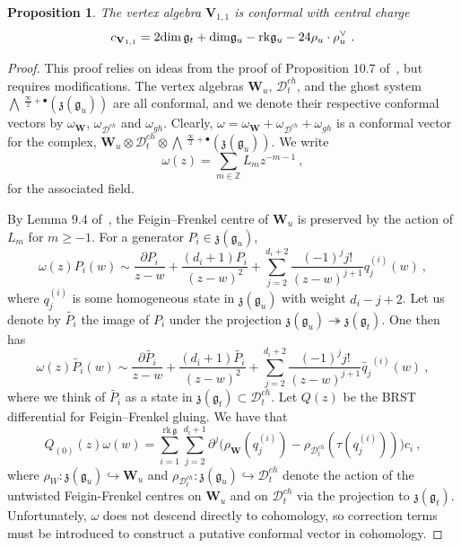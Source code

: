 \documentclass[a4paper]{article}
\newtheorem{prop}[thm]{Proposition}
\def\IZ{\mathbb{Z}}
\def\dim{{\rm dim}}
\def\gf{\mathfrak{g}}
\def \zf{\mathfrak{z}}
\def \rk{\mathrm{rk}}
\newcommand{\Li}[1]{\mathrm{\bigwedge}\,^{\frac{\infty}{2}+#1}}
\def\D{\mathcal{D}^{ch}}
\def\W{\mathbf{W}}
\def\V{\mathbf{V}}
\begin{document}
\begin{prop}\label{prop:mixed_trin_conf}
The vertex algebra $\V_{1,1}$ is conformal with central charge
\begin{equation*}
	c_{\V_{1,1}} = 2\dim\,\gf_t + \dim \gf_u -\rk \gf_u -24 \rho_u\cdot \rho_u^\vee~.
\end{equation*}
\end{prop}
\begin{proof}
This proof relies on ideas from the proof of Proposition $10.7$ of~\cite{Arakawa:2018egx}, but requires modifications. The vertex algebras $\W_u$, $\D_t$, and the ghost system $\Li{\bullet}(\zf(\gf_u))$ are all conformal, and we denote their respective conformal vectors by $\omega_\W$, $\omega_{\D}$ and $\omega_{gh}$. Clearly, $\omega = \omega_\W+\omega_{\D}+\omega_{gh}$ is a conformal vector for the complex, $\W_u\otimes \D_t \otimes \Li{\bullet}(\zf(\gf_u))$. We write
\begin{equation*}
	\omega(z) = \sum_{m\in\IZ} L_m z^{-m-1}~,
\end{equation*}
for the associated field.

By Lemma $9.4$ of~\cite{Arakawa:2018egx}, the Feigin--Frenkel centre of $\W_u$ is preserved by the action of $L_m$ for $m\geqslant -1$. For a generator $P_i\in\zf(\gf_u)$,
\begin{equation*}
	\omega(z) P_i(w) \sim \frac{\partial P_i}{z-w} +\frac{(d_i+1) P_i}{(z-w)^2}+\sum_{j=2}^{d_i+2}\frac{(-1)^j j!}{(z-w)^{j+1}} q_j^{(i)}(w)~,
\end{equation*}
where $q_j^{(i)}$ is some homogeneous state in $\zf(\gf_u)$ with weight $d_i-j+2$. Let us denote by $\widetilde{P_i}$ the image of $P_i$ under the projection $\zf(\gf_u)\twoheadrightarrow \zf(\gf_t)$. One then has
\begin{equation*}
	\omega(z) \widetilde{P_i}(w) \sim \frac{\partial \widetilde{P_i}}{z-w} +\frac{(d_i+1) \widetilde{P_i}}{(z-w)^2}+\sum_{j=2}^{d_i+2}\frac{(-1)^j j!}{(z-w)^{j+1}} \widetilde{q_j}^{(i)}(w)~,
\end{equation*}
where we think of $\widetilde{P_i}$ as a state in $\zf(\gf_t)\subset\D_t$. Let $Q(z)$ be the BRST differential for Feigin--Frenkel gluing. We have that
\begin{equation*}
	Q_{(0)}(z) \omega(w) = \sum_{i=1}^{\mathrm{rk}\,\gf}\sum_{j=2}^{d_i+1} \partial^j \big(\rho_\W(q_j^{(i)}) -\rho_{\D_t}(\tau(q_j^{(i)}))\big)c_i~,
\end{equation*}
where $\rho_W:\zf(\gf_u)\hookrightarrow \W_u$ and $\rho_{\D_t}:\zf(\gf_u)\hookrightarrow \D_t$ denote the action of the untwisted Feigin-Frenkel centres on $\W_u$ and on $\D_t$ via the projection to $\zf(\gf_t)$. Unfortunately, $\omega$ does not descend directly to cohomology, so correction terms must be introduced to construct a putative conformal vector in cohomology.


\end{proof}
\end{document}
